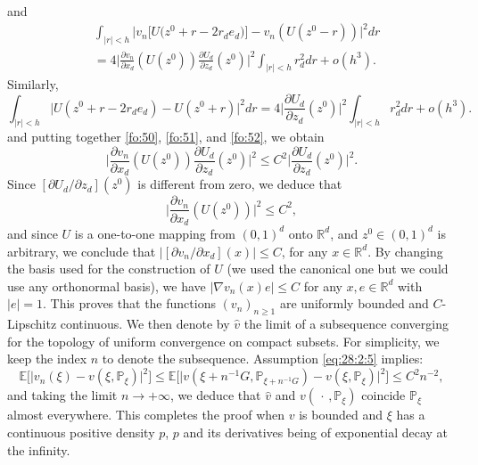 \documentclass[11pt]{amsart}
\begin{document}
and
\begin{equation}
\label{fo:51}
\begin{split}
&\int_{\vert r \vert <h} \bigl\vert v_{n}\bigl[U \bigl(z^{0}+r - 2r_{d} e_{d}\bigr) \bigr] - v_{n}(U(z^{0}-r)) \bigr\vert^2 dr
\\
&= 4 \bigl\vert
\frac{\partial v_{n}}{\partial x_{d}}(U(z^{0})) 
\frac{\partial U_{d}}{\partial z_{d}}(z^{0}) \bigr\vert^2 \int_{\vert r \vert <h} r_{d}^2 dr + o(h^3).
\end{split}
\end{equation}
Similarly, 
\begin{equation}
\label{fo:52}
\int_{\vert r \vert < h} \bigl\vert U(z^{0}+r - 2r_{d} e_{d}) - U(z^{0}+r) \bigr\vert^2 dr
= 4 \bigl\vert 
\frac{\partial U_{d}}{\partial z_{d}}(z^{0}) \vert^2 \int_{\vert r \vert <h} r_{d}^2 dr + o(h^3).
\end{equation}
and putting together \eqref{fo:50},  \eqref{fo:51}, and \eqref{fo:52}, we obtain
\begin{equation*}
\bigl\vert \frac{\partial v_{n}}{\partial x_{d}}(U(z^{0})) \frac{\partial U_{d}}{\partial z_{d}}(z^{0}) \vert^2
 \leq 
C^2 
\bigl\vert \frac{\partial U_{d}}{\partial z_{d}}(z^{0}) \vert^2.
\end{equation*}
Since $[\partial U_{d}/\partial z_{d}](z^{0})$ is different from zero, we deduce that 
\begin{equation*}
\bigl\vert \frac{\partial v_{n}}{\partial x_{d}}(U(z^{0}))  \vert^2
 \leq C^2,
\end{equation*}
and since $U$ is 
a one-to-one mapping from $(0,1)^d$ onto ${\mathbb R}^d$, and $z^0\in(0,1)^d$ is arbitrary, we conclude that
$\vert [\partial v_{n}/\partial x_{d}](x) \vert \leq C$, for any $x \in {\mathbb R}^d$. By changing the basis used for the construction of $U$ (we used the canonical one but we could use any orthonormal basis), we have $\vert \nabla v_{n}(x) e \vert \leq C$ for any $x,e \in {\mathbb R}^d$ with $\vert e \vert =1$. This proves that the functions 
$(v_{n})_{n \geq 1}$ are uniformly bounded and $C$-Lipschitz continuous. We then denote by $\hat{v}$
the limit of a subsequence converging for the topology of uniform convergence on compact subsets. For simplicity, we keep the index $n$ to denote the subsequence.  Assumption \eqref{eq:28:2:5} implies: 
\begin{equation*}
{\mathbb E} \bigl[ \vert v_{n}(\xi) - v(\xi,{\mathbb P}_{\xi}) \vert^2 \bigr] \leq 
{\mathbb E} \bigl[ \vert v(\xi+n^{-1}G,{\mathbb P}_{\xi+n^{-1}G}) - v(\xi,{\mathbb P}_{\xi}) \vert^2 \bigr] 
\leq C^2 n^{-2},
\end{equation*}
and taking the limit $n\to+\infty$, we deduce that $\hat{v}$ and $v(\,\cdot\,,{\mathbb P}_{\xi})$ coincide ${\mathbb P}_{\xi}$ almost everywhere. This completes the proof when 
$v$ is bounded and $\xi$ has a continuous positive density $p$, $p$ and its derivatives being of exponential decay at the infinity. 
\vspace{2pt}
\end{document}
